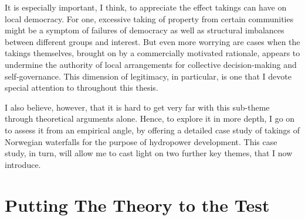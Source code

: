 {It is especially important, I think, to appreciate the effect takings can have on local democracy. For one, excessive taking of property from certain communities might be a symptom of failures of democracy as well as structural imbalances between different groups and interest. But even more worrying are cases when the takings themselves, brought on by a commercially motivated rationale, appears to undermine the authority of local arrangements for collective decision-making and self-governance. This dimension of legitimacy, in particular, is one that I devote special attention to throughout this thesis.

I also believe, however, that it is hard to get very far with this sub-theme through theoretical arguments alone. Hence, to explore it in more depth, I go on to assess it from an empirical angle, by offering a detailed case study of takings of Norwegian waterfalls for the purpose of hydropower development. This case study, in turn, will allow me to cast light on two further key themes, that I now introduce. %
}

\section{Putting The Theory to the Test}

